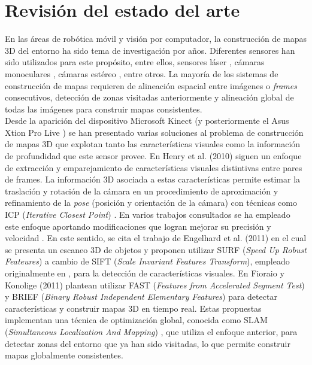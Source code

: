 \chapter{Revisión del estado del arte}
\label{cap:estado-del-arte}

En las áreas de robótica móvil y visión por computador, la construcción de mapas 3D del entorno ha sido tema de investigación por años. Diferentes sensores han sido utilizados para este propósito, entre ellos, sensores láser \cite{chou2013robotic,Montemerlo02fastslam}, cámaras monoculares \cite{tomono2009robust,clemente_etal_rss2007}, cámaras estéreo \cite{Mei11,Konolige08}, entre otros. La mayoría de los sistemas de construcción de mapas requieren de alineación espacial entre imágenes o \textit{frames} consecutivos, detección de zonas visitadas anteriormente y alineación global de todas las imágenes para construir mapas consistentes. \\
Desde la aparición del dispositivo Microsoft Kinect (y posteriormente el Asus Xtion Pro Live \cite{asus-xtion-pro-live}) se han presentado varias soluciones al problema de construcción de mapas 3D que explotan tanto las características visuales como la información de profundidad que este sensor provee. En Henry et al. (2010) \cite{henry2010rgb} siguen un enfoque de extracción y emparejamiento de características visuales distintivas entre pares de frames. La información 3D asociada a estas características permite estimar la traslación y rotación de la cámara en un procedimiento de aproximación y refinamiento de la \textit{pose} (posición y orientación de la cámara) con técnicas como ICP (\textit{Iterative Closest Point}) \cite{Besl92}. En varios trabajos consultados se ha empleado este enfoque aportando modificaciones que logran mejorar su precisión y velocidad \cite{engelhard2011real,hogmanbuilding,fioraio2011realtime,6614623}. En este sentido, se cita el trabajo de Engelhard et al. (2011) \cite{engelhard2011real} en el cual se presenta un escaneo 3D de objetos y proponen utilizar SURF (\textit{Speed Up Robust Feateures}) \cite{bay2008speeded} a cambio de SIFT (\textit{Scale Invariant Features Transform}), empleado originalmente en \cite{henry2010rgb}, para la detección de características visuales. En Fioraio y Konolige (2011) \cite{fioraio2011realtime} plantean utilizar FAST (\textit{Features from Accelerated Segment Test}) \cite{Rosten06machinelearning} y BRIEF (\textit{Binary Robust Independent Elementary Features}) \cite{Calonder12} para detectar características y construir mapas 3D en tiempo real. Estas propuestas  implementan una técnica de optimización global, conocida como SLAM (\textit{Simultaneous Localization And Mapping}) \cite{wiki-slam}, que utiliza el enfoque anterior, para detectar zonas del entorno que ya han sido visitadas, lo que permite construir mapas globalmente consistentes. \\
